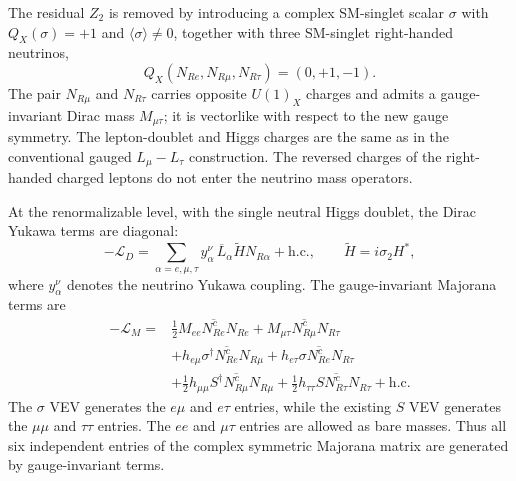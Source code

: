 \documentclass[12pt,a4paper]{article}
\begin{document}
The residual \(Z_2\) is removed by introducing a complex SM-singlet scalar \(\sigma\) with \(Q_X(\sigma)=+1\) and \(\langle\sigma\rangle\ne0\), together with three SM-singlet right-handed neutrinos,
\[
Q_X(N_{Re},N_{R\mu},N_{R\tau})=(0,+1,-1).
\]
The pair \(N_{R\mu}\) and \(N_{R\tau}\) carries opposite \(U(1)_X\) charges and admits a gauge-invariant Dirac mass \(M_{\mu\tau}\); it is vectorlike with respect to the new gauge symmetry. The lepton-doublet and Higgs charges are the same as in the conventional gauged \(L_\mu-L_\tau\) construction. The reversed charges of the right-handed charged leptons do not enter the neutrino mass operators.

At the renormalizable level, with the single neutral Higgs doublet, the Dirac Yukawa terms are diagonal:
\[
-\mathcal L_D=
\sum_{\alpha=e,\mu,\tau}
y_\alpha^\nu\,\overline L_\alpha\widetilde H N_{R\alpha}
+\mathrm{h.c.},
\qquad
\widetilde H=i\sigma_2H^*,
\]
where \(y_\alpha^\nu\) denotes the neutrino Yukawa coupling. The gauge-invariant Majorana terms are
\begin{align*}
-\mathcal L_M={}&
\frac12 M_{ee}\overline{N_{Re}^{c}}N_{Re}
+M_{\mu\tau}\overline{N_{R\mu}^{c}}N_{R\tau}\\
&+h_{e\mu}\sigma^\dagger\overline{N_{Re}^{c}}N_{R\mu}
+h_{e\tau}\sigma\overline{N_{Re}^{c}}N_{R\tau}\\
&+\frac12h_{\mu\mu}S^\dagger
\overline{N_{R\mu}^{c}}N_{R\mu}
+\frac12h_{\tau\tau}S
\overline{N_{R\tau}^{c}}N_{R\tau}
+\mathrm{h.c.}
\end{align*}
The \(\sigma\) VEV generates the \(e\mu\) and \(e\tau\) entries, while the existing \(S\) VEV generates the \(\mu\mu\) and \(\tau\tau\) entries. The \(ee\) and \(\mu\tau\) entries are allowed as bare masses. Thus all six independent entries of the complex symmetric Majorana matrix are generated by gauge-invariant terms.
\end{document}
